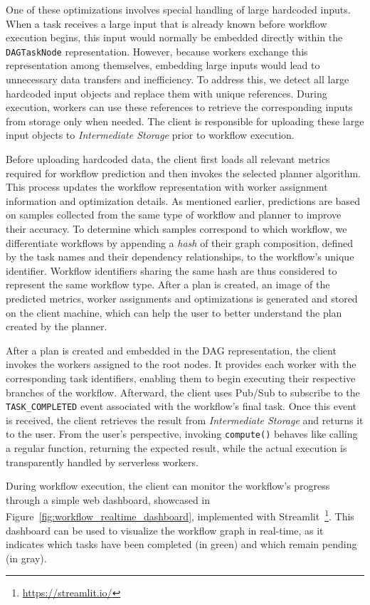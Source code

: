 One of these optimizations involves special handling of large hardcoded inputs. When a task receives a large input that is already known before workflow execution begins, this input would normally be embedded directly within the \texttt{DAGTaskNode} representation. However, because workers exchange this representation among themselves, embedding large inputs would lead to unnecessary data transfers and inefficiency. To address this, we detect all large hardcoded input objects and replace them with unique references. During execution, workers can use these references to retrieve the corresponding inputs from storage only when needed. The client is responsible for uploading these large input objects to \textit{Intermediate Storage} prior to workflow execution.

Before uploading hardcoded data, the client first loads all relevant metrics required for workflow prediction and then invokes the selected planner algorithm. This process updates the workflow representation with worker assignment information and optimization details. As mentioned earlier, predictions are based on samples collected from the same type of workflow and planner to improve their accuracy. To determine which samples correspond to which workflow, we differentiate workflows by appending a \textit{hash} of their graph composition, defined by the task names and their dependency relationships, to the workflow's unique identifier. Workflow identifiers sharing the same hash are thus considered to represent the same workflow type. After a plan is created, an image of the predicted metrics, worker assignments and optimizations is generated and stored on the client machine, which can help the user to better understand the plan created by the planner.

After a plan is created and embedded in the DAG representation, the client invokes the workers assigned to the root nodes. It provides each worker with the corresponding task identifiers, enabling them to begin executing their respective branches of the workflow. Afterward, the client uses Pub/Sub to subscribe to the \texttt{TASK\_COMPLETED} event associated with the workflow's final task. Once this event is received, the client retrieves the result from \textit{Intermediate Storage} and returns it to the user. From the user's perspective, invoking \texttt{compute()} behaves like calling a regular function, returning the expected result, while the actual execution is transparently handled by serverless workers.

During workflow execution, the client can monitor the workflow's progress through a simple web dashboard, showcased in Figure~\ref{fig:workflow_realtime_dashboard}, implemented with Streamlit~\footnote{\url{https://streamlit.io/}}. This dashboard can be used to visualize the workflow graph in real-time, as it indicates which tasks have been completed (in green) and which remain pending (in gray).

